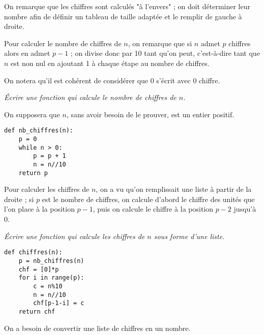 On remarque que les chiffres sont calculés "à l'envers" ; on doit déterminer leur nombre afin de définir un tableau de taille adaptée et le remplir de gauche à droite.

\medskip

Pour calculer le nombre de chiffres de $n$, on remarque que si $n$ admet $p$ chiffres alors  en admet $p-1$ ; on divise donc par 10 tant qu'on peut, c'est-à-dire tant que $n$ est non nul en ajoutant 1 à chaque étape au nombre de chiffres.

On notera qu'il est cohérent de considérer que 0 s'écrit avec 0 chiffre.
\begin{Exercise}[title= Nombre de chiffres]\it
Écrire une fonction  qui calcule le nombre de chiffres de $n$.

On supposera que $n$, sans avoir besoin de le prouver, est un entier positif.
\end{Exercise}
\begin{Answer} 
\begin{lstlisting}
def nb_chiffres(n):
    p = 0
    while n > 0:
        p = p + 1
        n = n//10
    return p
\end{lstlisting}
\end{Answer}

Pour calculer les chiffres de $n$, on a vu qu'on remplissait une liste à partir de la droite ; si $p$ est le nombre de chiffres, on calcule d'abord le chiffre des unités que l'on place à la position $p-1$, puis on calcule le chiffre à la position $p-2$ jusqu'à 0.
\begin{Exercise}[title= Chiffres]\it
Écrire une fonction  qui calcule les chiffres de $n$ sous forme d'une liste.
\end{Exercise}
\begin{Answer} 
\begin{lstlisting}
def chiffres(n):
    p = nb_chiffres(n)
    chf = [0]*p
    for i in range(p):
        c = n%10 
        n = n//10
        chf[p-1-i] = c
    return chf
\end{lstlisting}
\end{Answer}
On a besoin de convertir une liste de chiffres en un nombre.


